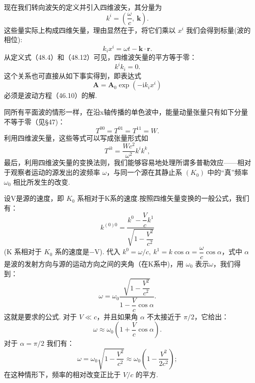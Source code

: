 现在我们转向波矢的定义并引入四维波矢，其分量为
\begin{equation}
  k^i=\left(\frac{\omega}{c},\ \boldsymbol{k}\right).
\end{equation}
这些量实际上构成四维矢量，理由显然在于，将它们乘以 $x^i$ 我们会得到标量(波的相位):
\begin{equation}
  k_ix^i=\omega t-\boldsymbol{k}\cdot\boldsymbol{r}.
\end{equation}
从定义式（48.4）和（48.12）可见，四维波矢量的平方等于零：
\begin{equation}
  k^ik_i=0.
\end{equation}
这个关系也可直接从如下事实得到，即表达式
\begin{equation*}
  \boldsymbol{A}=\boldsymbol{A}_0\exp(-\mathrm{i}k_ix^i)
\end{equation*}
必须是波动方程（46.10）的解.

同所有平面波的情形一样，在沿x轴传播的单色波中，能量动量张量只有如下分量不等于零（见§47)：
\begin{equation*}
  T^{00}=T^{01}=T^{11}=W.
\end{equation*}
利用四维波矢量，这些等式可以写成张量形式如
\begin{equation}
  T^{ik}=\frac{Wc^2}{\omega^2}k^ik^k,
\end{equation}
最后，利用四维波矢量的变换法则，我们能够容易地处理所谓多普勒效应——相对于观察者运动的源发出的波频率 $\omega$，与同一个源在其静止系 $(K_0)$ 中的“真”频率 $\omega_0$ 相比所发生的改变.

设V是源的速度，即 $K_0$ 系相对于K系的速度.按照四维矢量变换的一般公式，我们有：
\begin{equation*}
  k^{(0)0}=\frac{k^0-\dfrac{V}{c}k^1}{\sqrt{1-\dfrac{V^2}{c^2}}}
\end{equation*}
(K 系相对于 $K_0$ 系的速度是−V). 代入 $k^0 = \omega/c,\ k^1 = k\cos\alpha = \dfrac{\omega}{c}\cos\alpha$，式中 $\alpha$ 是波的发射方向与源的运动方向之间的夹角（在K系中)，用 $\omega_0$ 表示$\omega$，我们得到：
\begin{equation}
  \omega=\omega_0\frac{\sqrt{1-\dfrac{V^2}{c^2}}}{1-\dfrac{V}{c}\cos\alpha}.
\end{equation}
这就是要求的公式. 对于 $V\ll c$，并且如果角 $\alpha$ 不太接近于 $\pi/2$，它给出：
\begin{equation}
  \omega\approx\omega_0\left(1+\frac{V}{c}\cos\alpha\right).
\end{equation}
对于 $\alpha = \pi/2$ 我们有：
\begin{equation}
  \omega=\omega_0\sqrt{1-\frac{V^2}{c^2}}
  \approx\omega_0\left(1-\frac{V^2}{2c^2}\right);
\end{equation}
在这种情形下，频率的相对改变正比于 $V/c$ 的平方.


